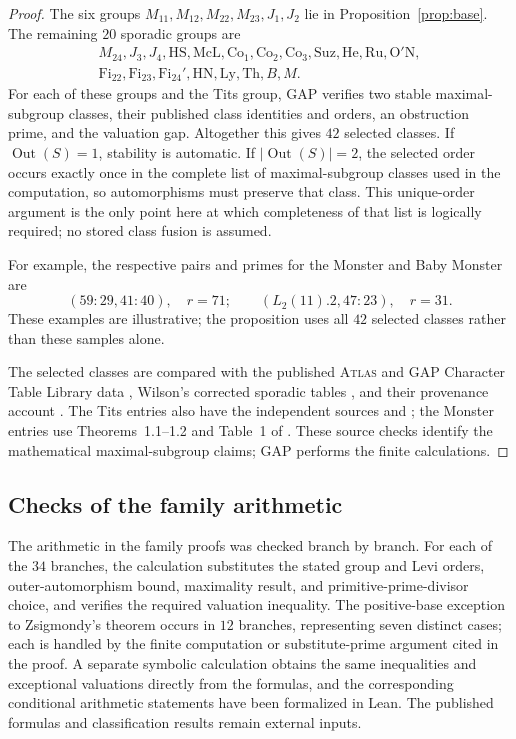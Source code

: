 \documentclass[11pt]{amsart}
\theoremstyle{definition}
\theoremstyle{remark}
\DeclareMathOperator{\Out}{Out}
\begin{document}
\begin{proof}
The six groups $M_{11},M_{12},M_{22},M_{23},J_1,J_2$ lie in
Proposition~\ref{prop:base}. The remaining $20$ sporadic groups are
\[
\begin{gathered}
M_{24},J_3,J_4,\mathrm{HS},\mathrm{McL},\mathrm{Co}_1,\mathrm{Co}_2,
\mathrm{Co}_3,\mathrm{Suz},\mathrm{He},\mathrm{Ru},\mathrm{O'N},\\
\mathrm{Fi}_{22},\mathrm{Fi}_{23},\mathrm{Fi}_{24}',\mathrm{HN},
\mathrm{Ly},\mathrm{Th},B,M.
\end{gathered}
\]
For each of these groups and the Tits group, GAP verifies two stable
maximal-subgroup classes, their published class identities and orders, an
obstruction prime, and the valuation gap. Altogether this gives $42$ selected
classes. If $\Out(S)=1$, stability is automatic. If
$|\Out(S)|=2$, the selected order occurs exactly once in the complete
list of maximal-subgroup classes used in the computation, so automorphisms must
preserve that class. This unique-order argument is the only point here at which
completeness of that list is logically required; no stored class fusion is
assumed.

For example, the respective pairs and primes for the Monster and Baby Monster
are
\[
 (59{:}29,41{:}40),\quad r=71;
 \qquad
 (L_2(11){.}2,47{:}23),\quad r=31.
\]
These examples are illustrative; the proposition uses all $42$ selected
classes rather than these samples alone.

The selected classes are compared with the published \textsc{Atlas}
and GAP Character Table Library data \cite{CTblLib,ATLAS}, Wilson's
corrected sporadic tables
\cite[\S4, pp.~66--68]{Wilson2017}, and their provenance account
\cite[\S2, pp.~23--24]{BreuerMalleOBrien2017}. The Tits entries also have the
independent sources \cite[pp.~553--563]{Wilson1984} and
\cite{Tchakerian1986}; the Monster entries use Theorems~1.1--1.2 and Table~1
of \cite[pp.~862--863]{DietrichEtAl2026}. These source checks identify the
mathematical maximal-subgroup claims; GAP performs the finite calculations.
\end{proof}

\subsection{Checks of the family arithmetic}

The arithmetic in the family proofs was checked branch by branch. For each of
the $34$ branches, the calculation substitutes the stated group and Levi
orders, outer-automorphism bound, maximality result, and
primitive-prime-divisor choice, and verifies the required valuation inequality.
The positive-base exception to Zsigmondy's theorem occurs in $12$ branches,
representing seven distinct cases; each is handled by the finite computation
or substitute-prime argument cited in the proof. A separate symbolic
calculation obtains the same inequalities and exceptional valuations directly
from the formulas, and the corresponding conditional arithmetic statements
have been formalized in Lean. The published formulas and classification
results remain external inputs.
\end{document}
